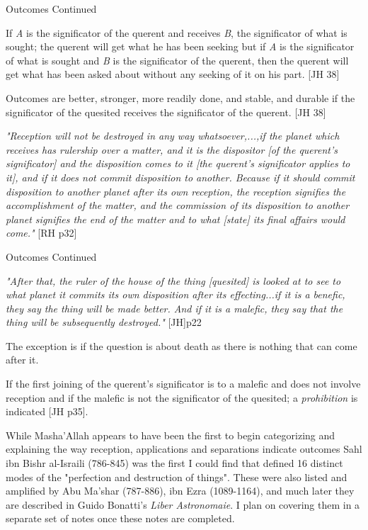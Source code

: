 \begin{frame}[t]{Outcomes Continued}

If \textsl{A} is the significator of the querent and receives \textsl{B}, the significator of what is sought; the querent will get what he has been seeking but if \textsl{A} is the significator of what is sought and \textsl{B} is the significator of the querent, then the querent will get what has been asked about without any seeking of it on his part. [JH 38]

Outcomes are better, stronger, more readily done, and stable, and durable if the significator of the quesited receives the significator of the querent. [JH 38]

\begin{block}{}
\textsl{"Reception will not be destroyed in any way whatsoever,...,if the planet which receives has rulership over a matter, and it is the dispositor [of the querent's significator] and the disposition comes to it [the querent's significator applies to it], and if it does not commit disposition to another. Because if it should commit disposition to another planet after its own reception, the reception signifies the accomplishment of the matter, and the commission of its disposition to another planet signifies the end of the matter and to what [state] its final affairs would come."} [RH p32]
\end{block}

\end{frame}
\begin{frame}[t]{Outcomes Continued}

\begin{block}{}
\textsl{"After that, the ruler of the house of the thing [quesited] is looked at to see to what planet it commits its own disposition after its effecting...if it is a benefic, they say the thing will be made better. And if it is a malefic, they say that the thing will be subsequently destroyed."} [JH]p22
\end{block}

The exception is if the question is about death as there is nothing that can come after it.

If the first joining of the querent's significator is to a malefic and does not involve reception and if the malefic is not the significator of the quesited;  a \textsl{prohibition} is indicated [JH p35].

While Masha'Allah appears to have been the first to begin categorizing and explaining the way reception, applications and separations indicate outcomes Sahl ibn Bishr al-Israili (786-845) was the first I could find that defined 16 distinct modes of the "perfection and destruction of things". These were also listed and amplified by  Abu Ma'shar (787-886),  ibn Ezra (1089-1164), and much later they are described in Guido Bonatti's \textsl{Liber Astronomaie}. I plan on covering them in a separate set of notes once these notes are completed.
\end{frame}